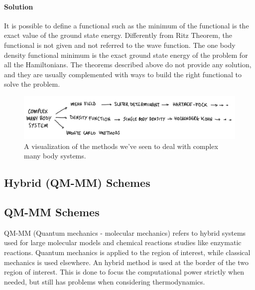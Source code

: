 			\paragraph{Solution}
			It is possible to define a functional such as the minimum of the functional is the exact value of the ground state energy.
			Differently from Ritz Theorem, the functional is not given and not referred to the wave function.
			The one body density functional minimum is the exact ground state energy of the problem for all the Hamiltonians.
			The theorems described above do not provide any solution, and they are usually complemented with ways to build the right functional to solve the problem.


\begin{figure}[htbp!]
	\centering
	\includegraphics[scale=0.30]{img_15}
	\caption{A visualization of the methods we've seen to deal with complex many body systems.}
\end{figure}

\subsection{Hybrid (QM-MM) Schemes}

	\subsection{QM-MM Schemes}
	QM-MM (Quantum mechanics - molecular mechanics) refers to hybrid systems used for large molecular models and chemical reactions studies like enzymatic reactions.
	Quantum mechanics is applied to the region of interest, while classical mechanics is used elsewhere.
	An hybrid method is used at the border of the two region of interest.
	This is done to focus the computational power strictly when needed, but still has problems when considering thermodynamics.

